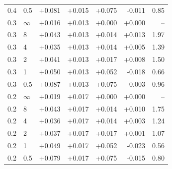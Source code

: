 \begin{tabular}{@{}llrrrrr@{}}
0.4 & 0.5 & +0.081 & +0.015 & +0.075 & -0.011 & 0.85 \\
0.3 & $\infty$ & +0.016 & +0.013 & +0.000 & +0.000 & -- \\
0.3 & 8 & +0.043 & +0.013 & +0.014 & +0.013 & 1.97 \\
0.3 & 4 & +0.035 & +0.013 & +0.014 & +0.005 & 1.39 \\
0.3 & 2 & +0.041 & +0.013 & +0.017 & +0.008 & 1.50 \\
0.3 & 1 & +0.050 & +0.013 & +0.052 & -0.018 & 0.66 \\
0.3 & 0.5 & +0.087 & +0.013 & +0.075 & -0.003 & 0.96 \\
0.2 & $\infty$ & +0.019 & +0.017 & +0.000 & +0.000 & -- \\
0.2 & 8 & +0.043 & +0.017 & +0.014 & +0.010 & 1.75 \\
0.2 & 4 & +0.036 & +0.017 & +0.014 & +0.003 & 1.24 \\
0.2 & 2 & +0.037 & +0.017 & +0.017 & +0.001 & 1.07 \\
0.2 & 1 & +0.049 & +0.017 & +0.052 & -0.023 & 0.56 \\
0.2 & 0.5 & +0.079 & +0.017 & +0.075 & -0.015 & 0.80 \\
\bottomrule
\end{tabular}
